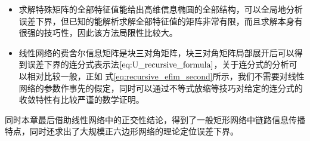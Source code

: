   \begin{itemize}
  \item 求解特殊矩阵的全部特征值能给出高维信息椭圆的全部结构，可以全局地分析误差下界，但已知的能解析求解全部特征值的矩阵非常有限，而且求解本身有很强的技巧性，因此该方法局限性比较大。
  \item 线性网络的费舍尔信息矩阵是块三对角矩阵，块三对角矩阵局部展开后可以得到误差下界的连分式表示法$\ref{eq:U_recursive_formula}$，关于连分式的分析可以相对比较一般，正如 式\ref{eq:recursive_efim_second}所示，我们不需要对线性网络的参数作事先的假定，同时可以通过不等式放缩等技巧对给定的连分式的收敛特性有比较严谨的数学证明。
  \end{itemize}

  同时本章最后借助线性网络中的正交性结论，得到了一般矩形网络中链路信息传播特点，同时还求出了大规模正六边形网络的理论定位误差下界。